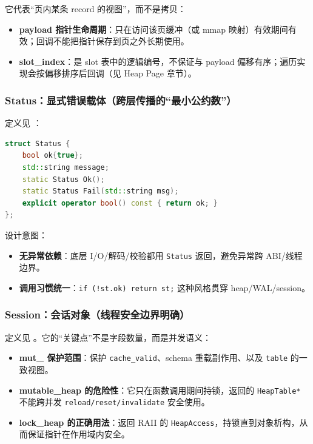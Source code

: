 它代表“页内某条 record 的视图”，而不是拷贝：

\begin{itemize}
  \item \textbf{payload 指针生命周期}：只在访问该页缓冲（或 mmap 映射）有效期间有效；回调不能把指针保存到页之外长期使用。
  \item \textbf{slot\_index}：是 slot 表中的逻辑编号，不保证与 payload 偏移有序；遍历实现会按偏移排序后回调（见 Heap Page 章节）。
\end{itemize}

\subsubsection{Status：显式错误载体（跨层传播的“最小公约数”）}

定义见 ：

\begin{lstlisting}[language=C++,caption={Status（原型）}]
struct Status {
    bool ok{true};
    std::string message;
    static Status Ok();
    static Status Fail(std::string msg);
    explicit operator bool() const { return ok; }
};
\end{lstlisting}

设计意图：

\begin{itemize}
  \item \textbf{无异常依赖}：底层 I/O/解码/校验都用 \texttt{Status} 返回，避免异常跨 ABI/线程边界。
  \item \textbf{调用习惯统一}：\texttt{if (!st.ok) return st;} 这种风格贯穿 heap/WAL/session。
\end{itemize}

\subsubsection{Session：会话对象（线程安全边界明确）}

定义见 。它的“关键点”不是字段数量，而是并发语义：

\begin{itemize}
  \item \textbf{mut\_ 保护范围}：保护 \texttt{cache\_valid}、schema 重载副作用、以及 \texttt{table} 的一致视图。
  \item \textbf{mutable\_heap 的危险性}：它只在函数调用期间持锁，返回的 \texttt{HeapTable*} 不能跨并发 \texttt{reload/reset/invalidate} 安全使用。
  \item \textbf{lock\_heap 的正确用法}：返回 RAII 的 \texttt{HeapAccess}，持锁直到对象析构，从而保证指针在作用域内安全。
\end{itemize}

